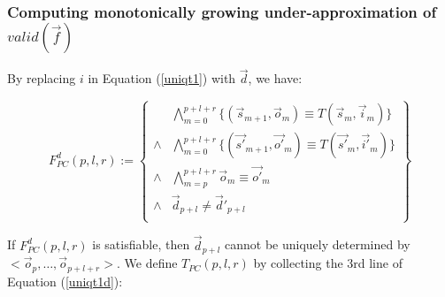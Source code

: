 \documentclass[runningheads,a4paper,orivec]{llncs}
\begin{document}
% 

\subsubsection{Computing monotonically growing under-approximation of $valid(\vec{f})$}\label{subsub_nonloop}
By replacing $i$ in Equation (\ref{uniqt1}) with $\vec{d}$,
we have:

\begin{equation}\label{uniqt1d}
F^d_{PC}(p,l,r):=
\left\{
\begin{array}{cc}
&\bigwedge_{m=0}^{p+l+r}
\{
(\vec{s}_{m+1},\vec{o}_m)\equiv T(\vec{s}_m,\vec{i}_m)
\}
\\
\wedge&\bigwedge_{m=0}^{p+l+r}
\{
(\vec{s'}_{m+1},\vec{o'}_m)\equiv T(\vec{s'}_m,\vec{i'}_m)
\}
\\
\wedge&\bigwedge_{m=p}^{p+l+r}\vec{o}_m\equiv \vec{o'}_m \\
\wedge& \vec{d}_{p+l}\ne \vec{d}'_{p+l} \\
\end{array}
\right\}
\end{equation}

If $F^d_{PC}(p,l,r)$ is satisfiable,
then $\vec{d}_{p+l}$ cannot be uniquely determined by $<\vec{o}_p,\dots,\vec{o}_{p+l+r}>$.
We define $T_{PC}(p,l,r)$ by collecting the 3rd line of Equation (\ref{uniqt1d}):
\end{document}
